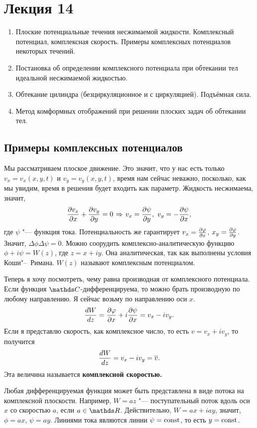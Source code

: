 \section{Лекция 14}
\begin{enumerate}
  \item Плоские потенциальные течения несжимаемой жидкости. Комплексный потенциал, комплексная скорость. Примеры комплексных потенциалов некоторых течений.
  \item Постановка об определении комплексного потенциала при обтекании тел идеальной несжимаемой жидкостью.
  \item Обтекание цилиндра (безциркуляционное  и с циркуляцией). Подъёмная сила.
  \item Метод комформных отображений при решении плоских задач об обтекании тел.
\end{enumerate}
\subsection{Примеры комплексных потенциалов}
Мы рассматриваем плоское движение. Это значит, что у нас есть только $v_x = v_x(x,y,t)$ и $v_y = v_y(x,y,t)$, время нам сейчас неважно, посколько, как мы увидим, время в решения будет входить как параметр. Жидкость несжимаема, значит, 
\[
  \CP{v_x}x + \CP{v_y}y = 0\imp v_x = \CP\psi y,\ v_y = -\CP\psi x,
\]
где $\psi$ "--- функция тока. Потенциальность же гарантирует $v_x = \frac{\partial \varphi}{\partial x}$, $x_y = \frac{\partial \varphi}{\partial y}$. Значит, $\Delta\phi \Delta \psi= 0$. Можно соорудить комплексно-аналитическую функцию $\phi + i\psi = W(z)$, где $z=x+i y$. Она аналитическая, так как выполнены условия Коши"--~Римана. $W(z)$ называют комплексным потенциалом.

Теперь я хочу посмотреть, чему равна производная от комплексного потенциала. Если функция $\C$-дифференцируема, то можно брать производную по любому направлению. Я сейчас возьму по направлению оси $x$.
\[
  \frac{dW}{dz} = \frac{\partial \varphi}{\partial x}+ i\frac{\partial \psi}{\partial x} = v_x - i v_y.
\]
Если я представлю скорость, как комплексное число, то есть $v = v_x + i v_y$, то получится
\[
  \frac{dW}{dz} = v_x - i v_y = \overline{v}.
\]
Эта величина называется \textbf{комплексной скоростью.}

Любая дифференцируемая функция может быть представлена в виде потока на комплексной плоскости. Например, $W = az$ "--- поступательный поток вдоль оси $x$ со скоростью $a$, если $a\in\R$. Действительно, $W = ax + iay$, значит, $\phi = ax$, $\psi = ay$. Линиями тока являются линии $\psi = \operatorname{const}$, то есть $y=\operatorname{const}$.

